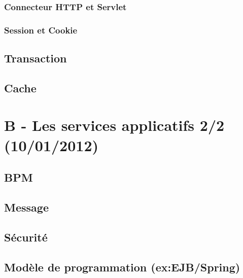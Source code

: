 \subsubsection{Connecteur HTTP et Servlet}
\subsubsection{Session et Cookie}

\subsection{Transaction}

\subsection{Cache}

\section{B - Les services applicatifs 2/2 (10/01/2012)}
\subsection{BPM}

\subsection{Message}

\subsection{Sécurité}
\subsection{Modèle de programmation (ex:EJB/Spring)}

